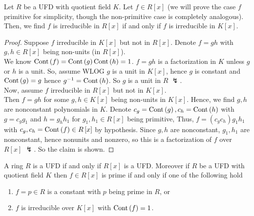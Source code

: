 \begin{theorem}
	Let \(R\) be a UFD with quotient field \(K\). Let \(f \in R\left[ x \right] \) (we will prove the case \(f\) primitive for simplicity, though the non-primitive case is completely analogous). Then, we find \(f\) is irreducible in \(R\left[ x \right] \) if and only if \(f\) is irreducible in \(K\left[ x \right] \).
\end{theorem}
\begin{proof}
	Suppose \(f\) irreducible in \(K\left[ x \right] \) but not in \(R\left[ x \right] \). Denote \(f = gh\) with \(g, h \in R\left[ x \right] \) being non-units (in \(R\left[ x \right] \)).\\
	We know \(\operatorname{Cont}\left( f \right) = \operatorname{Cont}\left( g \right) \operatorname{Cont}\left( h \right)  = 1\). \(f = gh\) is a factorization in \(K\) unless \(g\) or \(h\) is a unit. So, assume WLOG \(g\) is a unit in \(K\left[ x \right] \), hence \(g\) is constant and \(\operatorname{Cont}\left( g \right) = g\) hence \(g^{-1} = \operatorname{Cont}\left( h \right) \). So \(g\) is a unit in \(R\) \(\lightning\).\\
	Now, assume \(f\) irreducible in \(R\left[ x \right] \) but not in \(K\left[ x \right] \).\\
	Then \(f = gh\) for some \(g, h \in K\left[ x \right] \) being non-units in \(K\left[ x \right] \). Hence, we find \(g, h\) are nonconstant polynomials in \(K\). Denote \(c_{g} = \operatorname{Cont}\left( g \right) , c_{h}= \operatorname{Cont}\left( h \right) \) with \(g = c_{g}g_1\) and \(h = g_{h}h_1\) for \(g_1, h_1 \in R\left[ x \right] \) being primitive, Thus, \(f = \left( c_{g}c_{h} \right) g_1 h_1 \) with \(c_{g}, c_{h} = \operatorname{Cont}\left( f \right) \in R\left[ x \right]  \) by hypothesis. Since \(g, h\) are nonconstant, \(g_1, h_1\) are nonconstant, hence nonunits and nonzero, so this is a factorization of \(f\) over \(R\left[ x \right] \) \(\lightning\). So the claim is shown.
\end{proof}
\begin{theorem}
	A ring \(R\) is a UFD if and only if \(R\left[ x \right] \) is a UFD. Moreover if \(R\) be a UFD with quotient field \(K\) then \(f \in R\left[ x \right] \) is prime if and only if one of the following hold
	\begin{enumerate}
		\item \(f = p \in R\) is a constant with \(p\) being prime in \(R\), or
		\item \(f\) is irreducible over \(K\left[ x \right] \) with \(\operatorname{Cont}\left( f \right) = 1\).
	\end{enumerate}
\end{theorem}
